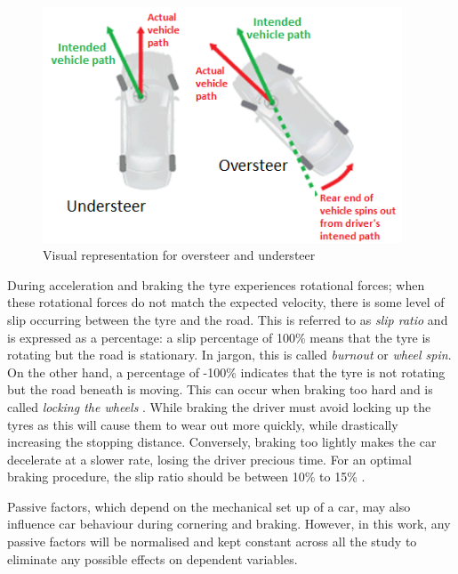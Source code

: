 \begin{figure}[!htb]
	\centering
	\includegraphics[height=7cm]{images/overundersteer}
	\caption{Visual representation for oversteer and understeer}
	\label{fig:overundersteer}
\end{figure}

During acceleration and braking the tyre experiences rotational forces; when these rotational forces do not match the expected velocity, there is some level of slip occurring between the tyre and the road. This is referred to as \emph{slip ratio} and is expressed as a percentage: a slip percentage of 100\% means that the tyre is rotating but the road is stationary. In jargon, this is called \emph{burnout} or \emph{wheel spin}. On the other hand, a percentage of -100\% indicates that the tyre is not rotating but the road beneath is moving. This can occur when braking too hard and is called \emph{locking the wheels} \cite{pacejka2006tire}. While braking the driver must avoid locking up the tyres as this will cause them to wear out more quickly, while drastically increasing the stopping distance. Conversely, braking too lightly makes the car decelerate at a slower rate, losing the driver precious time. For an optimal braking procedure, the slip ratio should be between 10\% to 15\% \cite{GoingFaster}.

Passive factors, which depend on the mechanical set up of a car, may also influence car behaviour during cornering and braking. However, in this work, any passive factors will be normalised and kept constant across all the study to eliminate any possible effects on dependent variables. 

